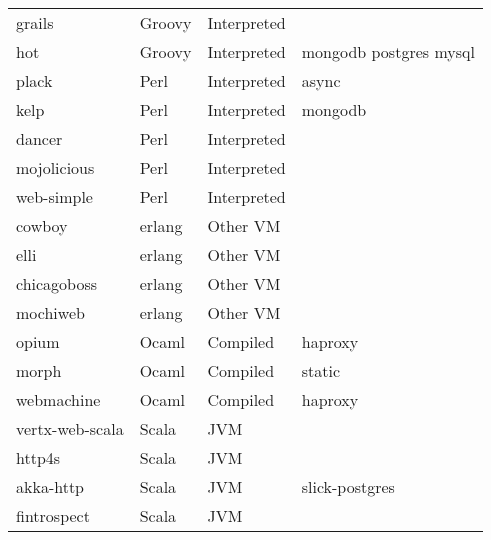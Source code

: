 \begin{longtable}{llll}
    grails           & Groovy      & Interpreted &                                                    \\
    hot              & Groovy      & Interpreted & mongodb postgres mysql                             \\
    plack            & Perl        & Interpreted & async                                              \\
    kelp             & Perl        & Interpreted & mongodb                                            \\
    dancer           & Perl        & Interpreted &                                                    \\
    mojolicious      & Perl        & Interpreted &                                                    \\
    web-simple       & Perl        & Interpreted &                                                    \\
    cowboy           & erlang      & Other VM    &                                                    \\
    elli             & erlang      & Other VM    &                                                    \\
    chicagoboss      & erlang      & Other VM    &                                                    \\
    mochiweb         & erlang      & Other VM    &                                                    \\
    opium            & Ocaml       & Compiled    & haproxy                                            \\
    morph            & Ocaml       & Compiled    & static                                             \\
    webmachine       & Ocaml       & Compiled    & haproxy                                            \\
    vertx-web-scala  & Scala       & JVM         &                                                    \\
    http4s           & Scala       & JVM         &                                                    \\
    akka-http        & Scala       & JVM         & slick-postgres                                     \\
    fintrospect      & Scala       & JVM         &                                                    \\

\end{longtable}
